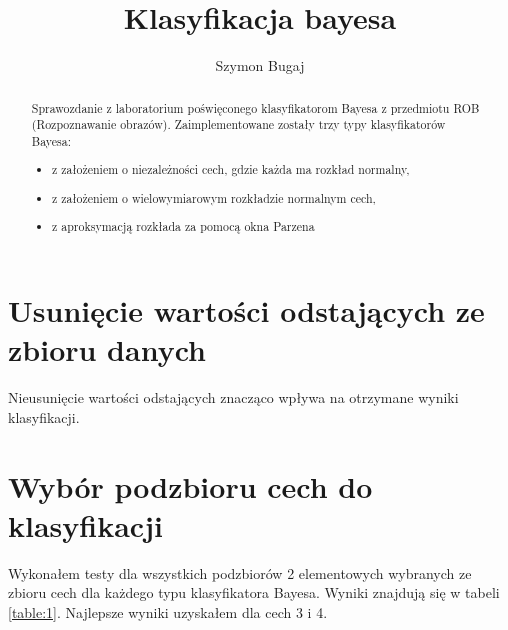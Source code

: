 \documentclass[fleqn]{article}
\begin{document}
\title{Klasyfikacja bayesa}
\author{Szymon Bugaj}

\maketitle

\begin{abstract}
Sprawozdanie z laboratorium poświęconego klasyfikatorom Bayesa z przedmiotu ROB (Rozpoznawanie obrazów). Zaimplementowane zostały trzy typy klasyfikatorów Bayesa:
\begin{itemize}
    \item z założeniem o niezależności cech, gdzie każda ma rozkład normalny,
    \item z założeniem o wielowymiarowym rozkładzie normalnym cech,
    \item z aproksymacją rozkłada za pomocą okna Parzena
\end{itemize}

\end{abstract}

\tableofcontents



\section{Usunięcie wartości odstających ze zbioru danych}
Nieusunięcie wartości odstających znacząco wpływa na otrzymane wyniki klasyfikacji.



\section{Wybór podzbioru cech do klasyfikacji}
Wykonałem testy dla wszystkich podzbiorów 2 elementowych wybranych ze zbioru cech dla każdego typu klasyfikatora Bayesa. Wyniki znajdują się w tabeli \ref{table:1}. Najlepsze wyniki uzyskałem dla cech 3 i 4.
\end{document}
